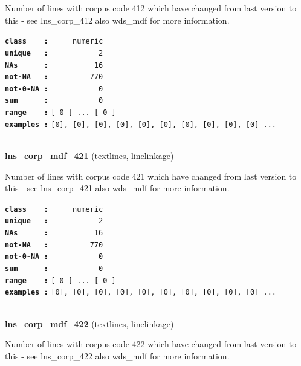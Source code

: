 \documentclass[]{article}
\begin{document}
Number of lines with corpus code 412 which have changed from last
version to this - see lns\_corp\_412 also wds\_mdf for more information.

\textbf{\texttt{class\ \ \ \ :}} \texttt{~~~~~numeric}\\
\textbf{\texttt{unique\ \ \ :}} \texttt{~~~~~~~~~~~2}\\
\textbf{\texttt{NAs\ \ \ \ \ \ :}} \texttt{~~~~~~~~~~16}\\
\textbf{\texttt{not-NA\ \ \ :}} \texttt{~~~~~~~~~770}\\
\textbf{\texttt{not-0-NA\ :}} \texttt{~~~~~~~~~~~0}\\
\textbf{\texttt{sum\ \ \ \ \ \ :}} \texttt{~~~~~~~~~~~0}\\
\textbf{\texttt{range\ \ \ \ :}}
\texttt{{[}\ 0\ {]}\ ...\ {[}\ 0\ {]}}\\
\textbf{\texttt{examples\ :}}
\texttt{{[}0{]},\ {[}0{]},\ {[}0{]},\ {[}0{]},\ {[}0{]},\ {[}0{]},\ {[}0{]},\ {[}0{]},\ {[}0{]},\ {[}0{]}\ ...}\\

~

\textbf{lns\_corp\_mdf\_421} (textlines, linelinkage)

Number of lines with corpus code 421 which have changed from last
version to this - see lns\_corp\_421 also wds\_mdf for more information.

\textbf{\texttt{class\ \ \ \ :}} \texttt{~~~~~numeric}\\
\textbf{\texttt{unique\ \ \ :}} \texttt{~~~~~~~~~~~2}\\
\textbf{\texttt{NAs\ \ \ \ \ \ :}} \texttt{~~~~~~~~~~16}\\
\textbf{\texttt{not-NA\ \ \ :}} \texttt{~~~~~~~~~770}\\
\textbf{\texttt{not-0-NA\ :}} \texttt{~~~~~~~~~~~0}\\
\textbf{\texttt{sum\ \ \ \ \ \ :}} \texttt{~~~~~~~~~~~0}\\
\textbf{\texttt{range\ \ \ \ :}}
\texttt{{[}\ 0\ {]}\ ...\ {[}\ 0\ {]}}\\
\textbf{\texttt{examples\ :}}
\texttt{{[}0{]},\ {[}0{]},\ {[}0{]},\ {[}0{]},\ {[}0{]},\ {[}0{]},\ {[}0{]},\ {[}0{]},\ {[}0{]},\ {[}0{]}\ ...}\\

~

\textbf{lns\_corp\_mdf\_422} (textlines, linelinkage)

Number of lines with corpus code 422 which have changed from last
version to this - see lns\_corp\_422 also wds\_mdf for more information.
\end{document}
